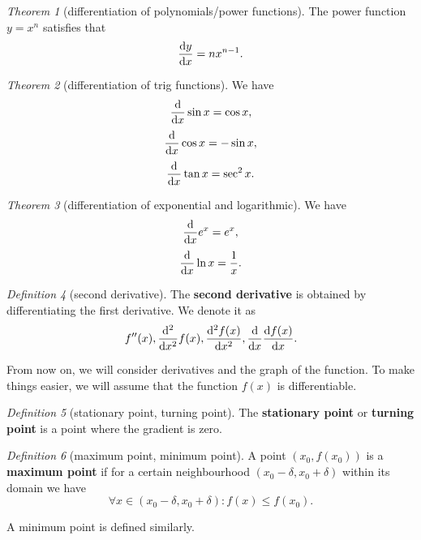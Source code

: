 \documentclass[8pt]{article}
\theoremstyle{remark}
\newtheorem{theorem}{Theorem}[section]
\newtheorem{definition}[theorem]{Definition}
\begin{document}
            \begin{theorem}[differentiation of polynomials/power functions]
                The power function $y = x^n$ satisfies that
                $$
                    \frac{\mathrm{d} y}{\mathrm{d} x} = n x ^ {n - 1}.
                $$
            \end{theorem}

            \begin{theorem}[differentiation of trig functions]
                We have
                $$
                    \frac{\mathrm{d}}{\mathrm{d} x} \sin x = \cos x,
                $$
                $$
                    \frac{\mathrm{d}}{\mathrm{d} x} \cos x = - \sin x,
                $$
                $$
                    \frac{\mathrm{d}}{\mathrm{d} x} \tan x = \sec^2 x.
                $$
            \end{theorem}

            \begin{theorem}[differentiation of exponential and logarithmic]
                We have
                $$
                    \frac{\mathrm{d}}{\mathrm{d} x} e^x = e^x,
                $$
                $$
                    \frac{\mathrm{d}}{\mathrm{d} x} \ln x = \frac{1}{x}.
                $$
            \end{theorem}

            \begin{definition}[second derivative]
                The \textbf{second derivative} is obtained by differentiating the first derivative. We denote it as
                $$
                    f''(x), \frac{\mathrm{d}^2}{\mathrm{d} x^2} f(x), \frac{\mathrm{d}^2 f(x)}{\mathrm{d} x^2}, \frac{\mathrm{d}}{\mathrm{d} x} \frac{\mathrm{d} f(x)}{\mathrm{d} x}.
                $$
            \end{definition}

            From now on, we will consider derivatives and the graph of the function. To make things easier, we will assume that the function $f(x)$ is differentiable.

            \begin{definition}[stationary point, turning point]
                The \textbf{stationary point} or \textbf{turning point} is a point where the gradient is zero.
            \end{definition}

            \begin{definition}[maximum point, minimum point]
                A point $(x_0, f(x_0))$ is a \textbf{maximum point} if for a certain neighbourhood $(x_0 - \delta, x_0 + \delta)$ within its domain we have
                $$
                    \forall x \in (x_0 - \delta, x_0 + \delta) : f(x) \leq f(x_0).
                $$

                A minimum point is defined similarly.
            \end{definition}
\end{document}
